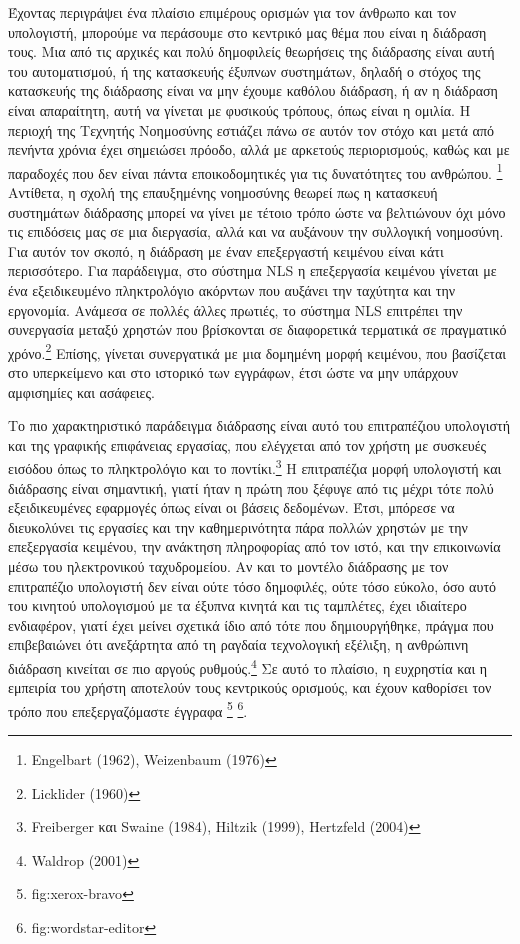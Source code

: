 \documentclass[
]{article}
\begin{document}
Έχοντας περιγράψει ένα πλαίσιο επιμέρους ορισμών για τον άνθρωπο και τον
υπολογιστή, μπορούμε να περάσουμε στο κεντρικό μας θέμα που είναι η
διάδραση τους. Μια από τις αρχικές και πολύ δημοφιλείς θεωρήσεις της
διάδρασης είναι αυτή του αυτοματισμού, ή της κατασκευής έξυπνων
συστημάτων, δηλαδή ο στόχος της κατασκευής της διάδρασης είναι να μην
έχουμε καθόλου διάδραση, ή αν η διάδραση είναι απαραίτητη, αυτή να
γίνεται με φυσικούς τρόπους, όπως είναι η ομιλία. Η περιοχή της Τεχνητής
Νοημοσύνης εστιάζει πάνω σε αυτόν τον στόχο και μετά από πενήντα χρόνια
έχει σημειώσει πρόοδο, αλλά με αρκετούς περιορισμούς, καθώς και με
παραδοχές που δεν είναι πάντα εποικοδομητικές για τις δυνατότητες του
ανθρώπου. \footnote{Engelbart (1962), Weizenbaum (1976)} Αντίθετα, η
σχολή της επαυξημένης νοημοσύνης θεωρεί πως η κατασκευή συστημάτων
διάδρασης μπορεί να γίνει με τέτοιο τρόπο ώστε να βελτιώνουν όχι μόνο
τις επιδόσεις μας σε μια διεργασία, αλλά και να αυξάνουν την συλλογική
νοημοσύνη. Για αυτόν τον σκοπό, η διάδραση με έναν επεξεργαστή κειμένου
είναι κάτι περισσότερο. Για παράδειγμα, στο σύστημα NLS η επεξεργασία
κειμένου γίνεται με ένα εξειδικευμένο πληκτρολόγιο ακόρντων που αυξάνει
την ταχύτητα και την εργονομία. Ανάμεσα σε πολλές άλλες πρωτιές, το
σύστημα NLS επιτρέπει την συνεργασία μεταξύ χρηστών που βρίσκονται σε
διαφορετικά τερματικά σε πραγματικό χρόνο.\footnote{Licklider (1960)}
Επίσης, γίνεται συνεργατικά με μια δομημένη μορφή κειμένου, που
βασίζεται στο υπερκείμενο και στο ιστορικό των εγγράφων, έτσι ώστε να
μην υπάρχουν αμφισημίες και ασάφειες.

Το πιο χαρακτηριστικό παράδειγμα διάδρασης είναι αυτό του επιτραπέζιου
υπολογιστή και της γραφικής επιφάνειας εργασίας, που ελέγχεται από τον
χρήστη με συσκευές εισόδου όπως το πληκτρολόγιο και το
ποντίκι.\footnote{Freiberger και Swaine (1984), Hiltzik (1999),
  Hertzfeld (2004)} Η επιτραπέζια μορφή υπολογιστή και διάδρασης είναι
σημαντική, γιατί ήταν η πρώτη που ξέφυγε από τις μέχρι τότε πολύ
εξειδικευμένες εφαρμογές όπως είναι οι βάσεις δεδομένων. Έτσι, μπόρεσε
να διευκολύνει τις εργασίες και την καθημερινότητα πάρα πολλών χρηστών
με την επεξεργασία κειμένου, την ανάκτηση πληροφορίας από τον ιστό, και
την επικοινωνία μέσω του ηλεκτρονικού ταχυδρομείου. Αν και το μοντέλο
διάδρασης με τον επιτραπέζιο υπολογιστή δεν είναι ούτε τόσο δημοφιλές,
ούτε τόσο εύκολο, όσο αυτό του κινητού υπολογισμού με τα έξυπνα κινητά
και τις ταμπλέτες, έχει ιδιαίτερο ενδιαφέρον, γιατί έχει μείνει σχετικά
ίδιο από τότε που δημιουργήθηκε, πράγμα που επιβεβαιώνει ότι ανεξάρτητα
από τη ραγδαία τεχνολογική εξέλιξη, η ανθρώπινη διάδραση κινείται σε πιο
αργούς ρυθμούς.\footnote{Waldrop (2001)} Σε αυτό το πλαίσιο, η ευχρηστία
και η εμπειρία του χρήστη αποτελούν τους κεντρικούς ορισμούς, και έχουν
καθορίσει τον τρόπο που επεξεργαζόμαστε έγγραφα \footnote{fig:xerox-bravo}
\footnote{fig:wordstar-editor}.
\end{document}
